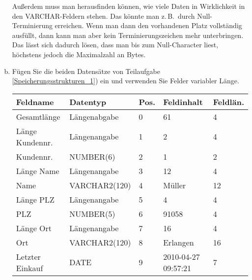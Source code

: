 \begin{enumerate}[a)]
\begin{solution}
Außerdem muss man herausfinden können, wie viele Daten in Wirklichkeit in den VARCHAR-Feldern stehen. Das könnte man z.\,B.\ durch Null-Terminierung erreichen. Wenn man dann den vorhandenen Platz vollständig ausfüllt, dann kann man aber kein Terminierungszeichen mehr unterbringen. Das lässt sich dadurch lösen, dass man bis zum Null-Character liest, höchstens jedoch die Maximalzahl an Bytes.
	\end{solution}

	\item \label{Speicherungsstrukturen_2} Fügen Sie die beiden Datensätze von Teilaufgabe \ref{Speicherungsstrukturen_1}) ein und verwenden Sie Felder variabler Länge.

	\begin{solution}
	\begin{tabular}{lllll}
		\hline\hline
		\textbf{Feldname} & \textbf{Datentyp} & \textbf{Pos.} & \textbf{Feldinhalt}                & \textbf{Feldlän.} \\ \hline\hline
		Gesamtlänge       & Längenabgabe      & 0             & 61                                 & 4                 \\ \hline
		Länge Kundennr.   & Längenangabe      & 1             & 2                                  & 4                 \\ \hline
		Kundennr.         & NUMBER(6)         & 2             & 1                                  & 2                 \\ \hline
		Länge Name        & Längenangabe      & 3             & 12                                 & 4                 \\ \hline
		Name              & VARCHAR2(120)     & 4             & Müller                             & 12                \\ \hline
		Länge PLZ         & Längenangabe      & 5             & 4                                  & 4                 \\ \hline
		PLZ               & NUMBER(5)         & 6             & 91058                              & 4                 \\ \hline
		Länge Ort         & Längenangabe      & 7             & 16                                 & 4                 \\ \hline
		Ort               & VARCHAR2(120)     & 8             & Erlangen                           & 16                \\ \hline
		Letzter Einkauf   & DATE              & 9             & \footnotesize{2010-04-27 09:57:21} & 7                 \\ \hline
	\end{tabular}
	

\end{solution}
\end{enumerate}

